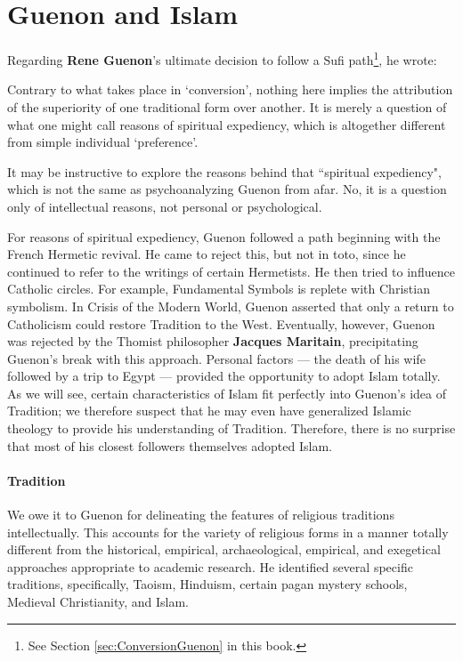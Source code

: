 \section{Guenon and Islam}

Regarding \textbf{Rene Guenon}'s ultimate decision to follow a Sufi path\footnote{See Section \ref{sec:ConversionGuenon} in this book.}, he wrote:

\begin{quotex}
Contrary to what takes place in `conversion', nothing here implies the attribution of the superiority of one traditional form over another. It is merely a question of what one might call reasons of spiritual expediency, which is altogether different from simple individual `preference'. 

\end{quotex}
It may be instructive to explore the reasons behind that ``spiritual expediency", which is not the same as psychoanalyzing Guenon from afar. No, it is a question only of intellectual reasons, not personal or psychological.

For reasons of spiritual expediency, Guenon followed a path beginning with the French Hermetic revival. He came to reject this, but not in toto, since he continued to refer to the writings of certain Hermetists. He then tried to influence Catholic circles. For example, Fundamental Symbols is replete with Christian symbolism. In Crisis of the Modern World, Guenon asserted that only a return to Catholicism could restore Tradition to the West. Eventually, however, Guenon was rejected by the Thomist philosopher \textbf{Jacques Maritain}, precipitating Guenon's break with this approach. Personal factors — the death of his wife followed by a trip to Egypt — provided the opportunity to adopt Islam totally. As we will see, certain characteristics of Islam fit perfectly into Guenon's idea of Tradition; we therefore suspect that he may even have generalized Islamic theology to provide his understanding of Tradition. Therefore, there is no surprise that most of his closest followers themselves adopted Islam.

\paragraph{Tradition}
We owe it to Guenon for delineating the features of religious traditions intellectually. This accounts for the variety of religious forms in a manner totally different from the historical, empirical, archaeological, empirical, and exegetical approaches appropriate to academic research. He identified several specific traditions, specifically, Taoism, Hinduism, certain pagan mystery schools, Medieval Christianity, and Islam.

